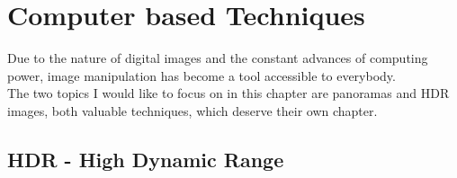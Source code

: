 \chapter{Computer based Techniques}
\label{chap:Computer-Based-Techniques}

Due to the nature of digital images and the constant advances of computing power, image manipulation has become a tool accessible to everybody.
\\
The two topics I would like to focus on in this chapter are \glspl{panorama} and \gls{HDR} images, both valuable techniques, which deserve their own chapter.

\section{HDR - High Dynamic Range}
\label{sec:HDR}

